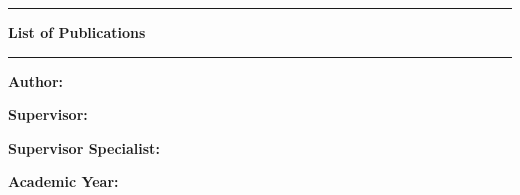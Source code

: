 {\begin{minipage}[c][0.20\textheight]{0.20\textwidth}
  \end{minipage}
  \begin{minipage}[c]{\textwidth}
    \doccol 
    \rule{\textwidth}{2pt}
  \end{minipage} \par
  \vspace{0.25cm}
  \noindent
  \begin{minipage}[c]{\textwidth}
    \centering \doccol \huge
    \textbf{List of Publications}
  \end{minipage} \par
  \vspace{0.25cm}
  \noindent
  \begin{minipage}[c]{\textwidth}
    \doccol 
    \rule{\textwidth}{2pt}
  \end{minipage}
  \noindent
  \begin{minipage}[t]{0.25\textwidth}\vspace{0pt}%
    \doccol \textbf{Author:}
  \end{minipage}
  \hspace{0.05\textwidth}
  \begin{minipage}[t]{0.7\textwidth}\vspace{0pt}%
    \@Author
  \end{minipage} \par
  \vspace{0.25cm}
  \noindent
  \begin{minipage}[t]{0.25\textwidth}\vspace{0pt}%
    \doccol \textbf{Supervisor:}
  \end{minipage}
  \hspace{0.05\textwidth}
  \begin{minipage}[t]{0.7\textwidth}\vspace{0pt}%
    \@Supervisor
  \end{minipage} \par
  \vspace{0.25cm}
  \noindent
  \begin{minipage}[t]{0.25\textwidth}\vspace{0pt}%
    \doccol \textbf{Supervisor Specialist:}
  \end{minipage}
  \hspace{0.05\textwidth}
  \begin{minipage}[t]{0.7\textwidth}\vspace{0pt}%
    \@SupervisorSpec
  \end{minipage} \par
  \vspace{0.25cm}
  \noindent
  \begin{minipage}[t]{0.25\textwidth}\vspace{0pt}%
    \doccol \textbf{Academic Year:}
  \end{minipage}
  \hspace{0.05\textwidth}
  \begin{minipage}[t]{0.7\textwidth}\vspace{0pt}%
    \@AcademicYear
  \end{minipage} \par
  \vspace{0.5cm}
}
